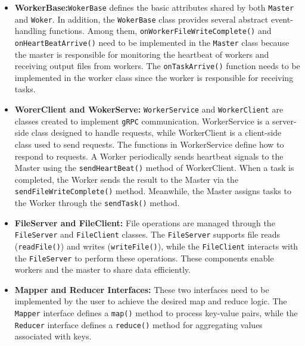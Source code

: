 \begin{itemize}
    \item \textbf{WorkerBase:}\texttt{WokerBase} defines the basic attributes shared by both \texttt{Master} and \texttt{Woker}. In addition, the \texttt{WokerBase} class provides several abstract event-handling functions. Among them, \texttt{onWorkerFileWriteComplete()} and \texttt{onHeartBeatArrive()} need to be implemented in the \texttt{Master} class because the master is responsible for monitoring the heartbeat of workers and receiving output files from workers. The \texttt{onTaskArrive()} function needs to be implemented in the worker class since the worker is responsible for receiving tasks.
    \item \textbf{WorerClient and WokerServe:} \texttt{WorkerService} and \texttt{WorkerClient} are classes created to implement \texttt{gRPC} communication. WorkerService is a server-side class designed to handle requests, while WorkerClient is a client-side class used to send requests. The functions in WorkerService define how to respond to requests. A Worker periodically sends heartbeat signals to the Master using the \texttt{sendHeartBeat()} method of WorkerClient. When a task is completed, the Worker sends the result to the Master via the \texttt{sendFileWriteComplete()} method. Meanwhile, the Master assigns tasks to the Worker through the \texttt{sendTask()} method.
    \item \textbf{FileServer and FileClient:} File operations are managed through the \texttt{FileServer} and \texttt{FileClient} classes. The \texttt{FileServer} supports file reads (\texttt{readFile()}) and writes (\texttt{writeFile()}), while the \texttt{FileClient} interacts with the \texttt{FileServer} to perform these operations. These components enable workers and the master to share data efficiently.
    \item \textbf{Mapper and Reducer Interfaces:} These two interfaces need to be implemented by the user to achieve the desired map and reduce logic. The \texttt{Mapper} interface defines a \texttt{map()} method to process key-value pairs, while the \texttt{Reducer} interface defines a \texttt{reduce()} method for aggregating values associated with keys.
\end{itemize}

